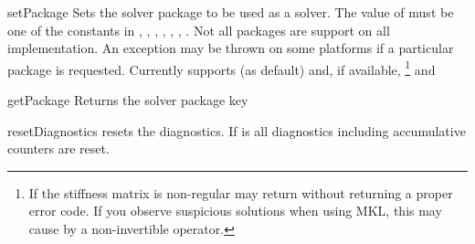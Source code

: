 \begin{methoddesc}[SolverOptions]{setPackage}{}
Sets the solver package to be used as a solver.  
The value of  must be one of the constants in , , , , , , .
Not all packages are support on all implementation. An exception may be thrown on some platforms if a particular package is requested. Currently \finley supports  (as default)
and, if available, 
\footnote{If the stiffness matrix is non-regular \MKL may return without 
returning a proper error code. If you observe suspicious solutions when using MKL, this may cause by a non-invertible operator. }
and 

\end{methoddesc}

\begin{methoddesc}[SolverOptions]{getPackage}{}
Returns the solver package key
\end{methoddesc}


\begin{methoddesc}[SolverOptions]{resetDiagnostics}{}
resets the diagnostics. If  is \True all diagnostics including accumulative counters are reset.
\end{methoddesc}

